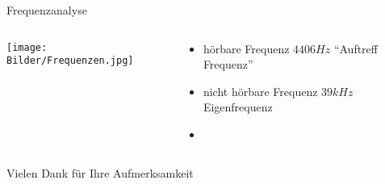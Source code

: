 \documentclass[12pt]{beamer}
\begin{document}
\begin{frame}{Frequenzanalyse}
\begin{columns}
\begin{column}{.6\textwidth}
\texttt{[image: Bilder/Frequenzen.jpg]}
\end{column}
\begin{column}{.4\textwidth}
\begin{itemize}
\item<2-> hörbare Frequenz $4406Hz$ "`Auftreff Frequenz"'
\item<3-> nicht hörbare Frequenz $39kHz$ Eigenfrequenz
\item[ ] \ 
\end{itemize}
\end{column}
\end{columns}
\end{frame}

\begin{frame}
\center
{\HUGE Vielen Dank für Ihre Aufmerksamkeit}
\end{frame}
\end{document}
